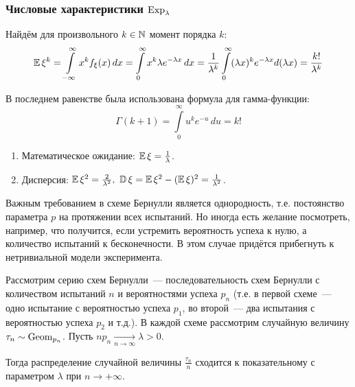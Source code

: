 \subsubsection{Числовые характеристики $\operatorname{\mathrm{Exp}}_{\lambda}$}

Найдём для произвольного $k \in \mathbb{N}$ момент порядка $k$:
\begin{equation*}
    \operatorname{\mathbb{E}} \xi^{k}=\int\limits_{-\infty}^{\infty} x^{k} f_{\xi}(x)\,d x=\int\limits_{0}^{\infty} x^{k} \lambda e^{-\lambda x}\,d x=\frac{1}{\lambda^{k}} \int\limits_{0}^{\infty}(\lambda x)^{k} e^{-\lambda x}d(\lambda x)=\frac{k !}{\lambda^{k}}
\end{equation*}

В последнем равенстве была использована формула для гамма-функции:
\begin{equation*}
    \Gamma(k+1)=\int\limits_{0}^{\infty} u^{k} e^{-u}\,d u=k !
\end{equation*}
\begin{enumerate}
    \item Математическое ожидание: $\operatorname{\mathbb{E}} \xi=\frac{1}{\lambda}$.
    \item Дисперсия: $\operatorname{\mathbb{E}} \xi^{2}=\frac{2}{\lambda^{2}}, ~ \operatorname{\mathbb{D}} \xi=\operatorname{\mathbb{E}} \xi^{2}-(\operatorname{\mathbb{E}} \xi)^{2}=\frac{1}{\lambda^{2}}$.
\end{enumerate}

Важным требованием в схеме Бернулли является однородность, т.е. постоянство параметра $p$ на протяжении всех испытаний.
Но иногда есть желание посмотреть, например, что получится, если устремить вероятность успеха к нулю, а количество испытаний к бесконечности. В этом случае придётся прибегнуть к нетривиальной модели эксперимента.
\begin{thm*}
    Рассмотрим серию схем Бернулли~--- последовательность схем Бернулли с количеством испытаний $n$ и вероятностями успеха $p_n$ (т.е. в первой схеме~--- одно испытание с вероятностью успеха $p_1$, во второй~--- два испытания с вероятностью успеха $p_2$ и т.д.). В каждой схеме рассмотрим случайную величину $\tau_n \sim \operatorname{\mathrm{Geom}}_{p_n}$.
    Пусть $n p_n \xrightarrow[n \to \infty]{} \lambda > 0$.

    Тогда распределение случайной величины $\frac{\tau_n}{n}$ сходится к показательному с параметром $\lambda$ при $n \to +\infty$.
\end{thm*}

